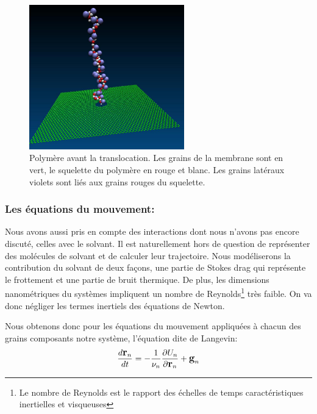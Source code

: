 \documentclass[a4paper,11pt]{article}
\begin{document}
\begin{figure}[H]
\begin{center}
\includegraphics[width=0.6\textwidth]{systemmodlo.jpg}
\caption{Polymère avant la translocation. Les grains de la membrane sont en vert, le squelette du polymère en rouge et blanc. Les grains latéraux violets sont liés aux grains rouges du squelette.}
\label{sytmod}
\end{center}
\end{figure}

\subsubsection*{Les équations du mouvement:}

Nous avons aussi pris en compte des interactions dont nous n'avons pas encore discuté, celles avec le solvant. Il est naturellement hors de question de représenter des molécules de solvant et de calculer leur trajectoire. Nous modéliserons la contribution du solvant de deux façons, une partie de Stokes drag qui représente le frottement et une partie de bruit thermique. De plus, les dimensions nanométriques du systèmes impliquent un nombre de Reynolds\footnote{Le nombre de Reynolds est le rapport des échelles de temps caractéristiques inertielles et visqueuses} très faible. On va donc négliger les termes inertiels des équations de Newton.

Nous obtenons donc pour les équations du mouvement appliquées à chacun des grains composants notre système, l'équation dite de Langevin:
\begin{eqnarray}
\large{
\frac{d \textbf{r}_n}{dt} = - \frac{1}{\nu_n}\frac{\partial U_{n}}{\partial \textbf{r}_n}   + \textbf{g}_n}
\label{langevin}
\end{eqnarray}
\end{document}
